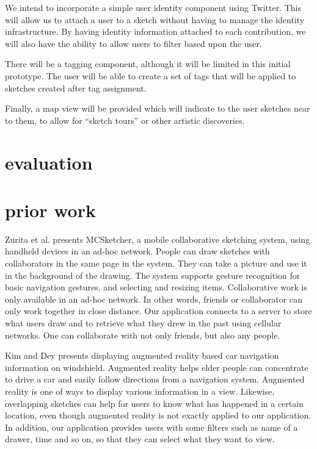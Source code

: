 \documentclass{chi2009}
\begin{document}
We intend to incorporate a simple user identity component using Twitter.  This
will allow us to attach a user to a sketch without having to manage the
identity infrastructure.  By having identity information attached to each
contribution, we will also have the ability to allow users to filter based upon
the user.

There will be a tagging component, although it will be limited in this initial
prototype.  The user will be able to create a set of tags that will be applied
to sketches created after tag assignment.

Finally, a map view will be provided which will indicate to the user sketches
near to them, to allow for ``sketch tours'' or other artistic discoveries.

\section{evaluation}

\section{prior work}
Zurita et al. \cite{sketching:zurita} presents MCSketcher, a mobile
collaborative sketching system, using handheld devices in an ad-hoc network.
People can draw sketches with collaborators in the same page in the system.
They can take a picture and use it in the background of the drawing. The system
supports gesture recognition for basic navigation gestures, and selecting and
resizing items. Collaborative work is only available in an ad-hoc network. In
other words, friends or collaborator can only work together in close distance.
Our application connects to a server to store what users draw and to retrieve
what they drew in the past using cellular networks. One can collaborate with
not only friends, but also any people.

Kim and Dey \cite{augmented_reality:kim} presents displaying augmented reality
based car navigation information on windshield. Augmented reality helps elder
people can concentrate to drive a car and easily follow directions from a
navigation system. Augmented reality is one of ways to display various
information in a view. Likewise, overlapping sketches can help for users to
know what has happened in a certain location, even though augmented reality is
not exactly applied to our application. In addition, our application provides
users with some filters such as name of a drawer, time and so on, so that they
can select what they want to view.
\end{document}
